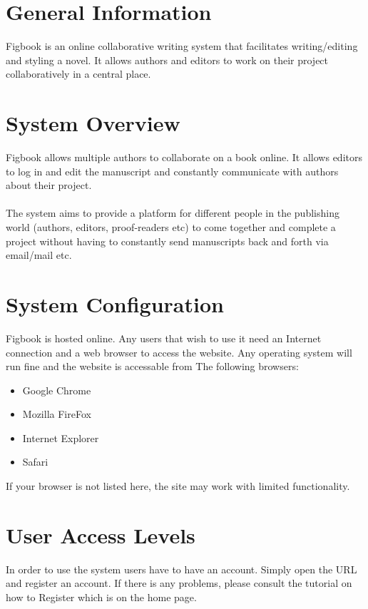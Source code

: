 \section{General Information}
\par{Figbook is an online collaborative writing system that facilitates writing/editing and styling a novel. It allows authors and editors to work on their project collaboratively in a central place.}

\section{System Overview}
\par{Figbook allows multiple authors to collaborate on a book online. It allows editors to log in and edit the manuscript and constantly communicate with authors about their project. \\ \\The system aims to provide a platform for different people in the publishing world (authors, editors, proof-readers etc) to come together and complete a project without having to constantly send manuscripts back and forth via email/mail etc.}

\section{System Configuration}
\par{Figbook is hosted online. Any users that wish to use it need an Internet connection and a web browser to access the website. Any operating system will run fine and the website is accessable from The following browsers: 
\begin{itemize}
\item Google Chrome
\item Mozilla FireFox
\item Internet Explorer
\item Safari
\end{itemize}

If your browser is not listed here, the site may work with limited functionality. }

\newpage
\section{User Access Levels}
In order to use the system users have to have an account. Simply open the URL and register an account. If there is any problems, please consult the tutorial on how to Register which is on the home page.

